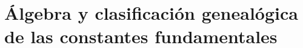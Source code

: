 \chapter{Álgebra y clasificación genealógica de las constantes fundamentales}
\label{chap:p3-final:27:algebra_clasificacion}



